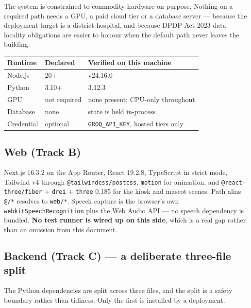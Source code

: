 \documentclass[10pt,a4paper,twocolumn]{article}
\newcommand{\pth}[1]{\textcolor{SecPurple}{\texttt{#1}}}
\newcommand{\cm}[1]{\texttt{#1}}
\begin{document}
The system is constrained to commodity hardware on purpose. Nothing on a required path needs a
GPU, a paid cloud tier or a database server --- because the deployment target is a district
hospital, and because DPDP Act 2023 data-locality obligations are easier to honour when the
default path never leaves the building.

\begin{center}\footnotesize\sffamily
\begin{tabular}{@{}p{1.7cm}p{1.9cm}p{3.6cm}@{}}
\toprule
\rowcolor{AccPurple!10}
\textbf{Runtime} & \textbf{Declared} & \textbf{Verified on this machine}\\
\midrule
Node.js & 20+ & v24.16.0\\
\addlinespace[2pt]
Python & 3.10+ & 3.12.3\\
\addlinespace[2pt]
GPU & not required & none present; CPU-only throughout\\
\addlinespace[2pt]
Database & none & state is held in-process\\
\addlinespace[2pt]
Credential & optional & \cm{GROQ\_API\_KEY}, hosted tiers only\\
\bottomrule
\end{tabular}
\end{center}

\subsection{Web (Track B)}
Next.js 16.3.2 on the App Router, React 19.2.8, TypeScript in strict mode, Tailwind v4 through
\cm{@tailwindcss/postcss}, \cm{motion} for animation, and \cm{@react-three/fiber} + \cm{drei} +
\cm{three} 0.185 for the kiosk and mascot scenes. Path alias \cm{@/*} resolves to \pth{web/*}.
Speech capture is the browser's own \cm{webkitSpeechRecognition} plus the Web Audio API --- no
speech dependency is bundled. \textbf{No test runner is wired up on this side}, which is a real gap
rather than an omission from this document.

\subsection{Backend (Track C) --- a deliberate three-file split}
The Python dependencies are split across three files, and the split is a safety boundary rather
than tidiness. Only the first is installed by a deployment.
\end{document}
